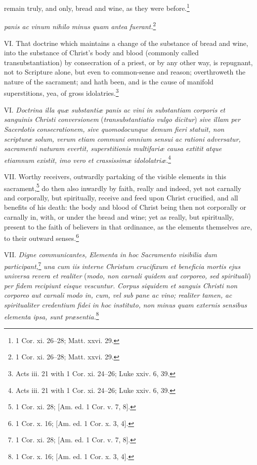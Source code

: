 remain truly, and only, bread and wine, as they were before.\footnote{1 Cor. xi. 26–28; Matt. xxvi. 29.}

\emph{panis ac vinum nihilo minus quam antea fuerant.}\footnote{1 Cor. xi. 26–28; Matt. xxvi. 29.}

VI. That doctrine which maintains a change of the substance of bread and wine, into the substance of Christ's body and blood (commonly called transubstantiation) by consecration of a priest, or by any other way, is repugnant, not to Scripture alone, but even to common-sense and reason; overthroweth the nature of the sacrament; and hath been, and is the cause of manifold superstitions, yea, of gross idolatries.\footnote{Acts iii. 21 with 1 Cor. xi. 24–26; Luke xxiv. 6, 39.}

VI. \emph{Doctrina illa quæ substantiæ panis ac vini in substantiam corporis et sanguinis Christi conversionem }(\emph{transubstantiatio vulgo dicitur})\emph{ sive illam per Sacerdotis consecrationem, sive quomodocunque demum fieri statuit, non scripturæ solum, verum etiam communi omnium sensui ac rationi adversatur, sacramenti naturam evertit, superstitionis multifariæ causa extitit atque etiamnum existit, imo vero et crassissimæ idololatriæ.}\footnote{Acts iii. 21 with 1 Cor. xi. 24–26; Luke xxiv. 6, 39.}

VII. Worthy receivers, outwardly partaking of the visible elements in this sacrament,\footnote{1 Cor. xi. 28; [Am. ed. 1 Cor. v. 7, 8].} do then also inwardly by faith, really and indeed, yet not carnally and corporally, but spiritually, receive and feed upon Christ crucified, and all benefits of his death: the body and blood of Christ being then not corporally or carnally in, with, or under the bread and wine; yet as really, but spiritually, present to the faith of believers in that ordinance, as the elements themselves are, to their outward senses.\footnote{1 Cor. x. 16; [Am. ed. 1 Cor. x. 3, 4].}

VII. \emph{Digne communicantes, Elementa in hoc Sacramento visibilia dum participant,}\footnote{1 Cor. xi. 28; [Am. ed. 1 Cor. v. 7, 8].}\emph{ una cum iis interne Christum crucifixum et beneficia mortis ejus universa revera et realiter }(\emph{modo, non carnali quidem aut corporeo, sed spirituali})\emph{ per fidem recipiunt eisque vescuntur. Corpus siquidem et sanguis Christi non corporeo aut carnali modo in, cum, vel sub pane ac vino; realiter tamen, ac spiritualiter credentium fidei in hoc instituto, non minus quam externis sensibus elementa ipsa, sunt præsentia.}\footnote{1 Cor. x. 16; [Am. ed. 1 Cor. x. 3, 4].}

